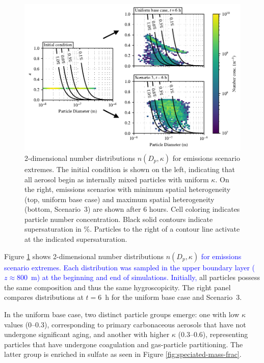 \documentclass[journal abbreviation, manuscript]{copernicus}
\begin{document}
\begin{figure}[!t]
	\centering
	\includegraphics[]{figures/2d-kappa-dist-three-panel-z40.pdf}
	\caption{2-dimensional number distributions $n(D_p, \kappa)$ for emissions scenario extremes. The initial condition is shown on the left, indicating that all aerosol begin as internally mixed particles with uniform $\kappa$. On the right, emissions scenarios with minimum spatial heterogeneity (top, uniform base case) and maximum spatial heterogeneity (bottom, Scenario~3) are shown after 6 hours. Cell coloring indicates particle number concentration. Black solid contours indicate supersaturation in $\%$. Particles to the right of a contour line activate at the indicated supersaturation.}
	\label{fig:kappa-dist}
\end{figure} 

Figure \ref{fig:kappa-dist} shows 2-dimensional number distributions
$n(D_p, \kappa)$ \textcolor{blue}{for emissions scenario extremes. Each distribution
was sampled in the upper boundary layer ($z\approx 800$~m) at the beginning 
and end of simulations. Initially,} all particles possess
the same composition and thus the same hygroscopicity.  The right
panel compares distributions at $t=6$~h for the uniform base case and
Scenario~3.

In the uniform base case, two distinct particle groups emerge: one
with low $\kappa$ values (0--0.3), corresponding to primary
carbonaceous aerosols that have not undergone significant aging, and
another with higher $\kappa$ (0.3--0.6), representing particles that
have undergone coagulation and gas-particle partitioning. The latter
group is enriched in sulfate as seen in Figure
\ref{fig:speciated-mass-frac}.
\end{document}
